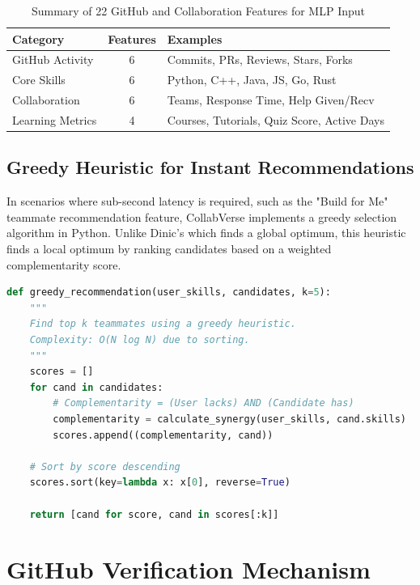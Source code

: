 \documentclass[12pt,a4paper]{article}
\begin{document}
\begin{table}[H]
\centering
\caption{Summary of 22 GitHub and Collaboration Features for MLP Input}
\label{tab:mlp_features}
\begin{tabular}{|l|c|l|}
\hline
\textbf{Category} & \textbf{Features} & \textbf{Examples} \\ \hline
GitHub Activity & 6 & Commits, PRs, Reviews, Stars, Forks \\ \hline
Core Skills & 6 & Python, C++, Java, JS, Go, Rust \\ \hline
Collaboration & 6 & Teams, Response Time, Help Given/Recv \\ \hline
Learning Metrics & 4 & Courses, Tutorials, Quiz Score, Active Days \\ \hline
\end{tabular}
\end{table}

\subsection{Greedy Heuristic for Instant Recommendations}
In scenarios where sub-second latency is required, such as the "Build for Me" teammate recommendation feature, CollabVerse implements a greedy selection algorithm in Python. Unlike Dinic's which finds a global optimum, this heuristic finds a local optimum by ranking candidates based on a weighted complementarity score.

\begin{lstlisting}[language=Python, caption=Greedy Teammate Recommendation Heuristic]
def greedy_recommendation(user_skills, candidates, k=5):
    """
    Find top k teammates using a greedy heuristic.
    Complexity: O(N log N) due to sorting.
    """
    scores = []
    for cand in candidates:
        # Complementarity = (User lacks) AND (Candidate has)
        complementarity = calculate_synergy(user_skills, cand.skills)
        scores.append((complementarity, cand))
    
    # Sort by score descending
    scores.sort(key=lambda x: x[0], reverse=True)
    
    return [cand for score, cand in scores[:k]]
\end{lstlisting}

\section{GitHub Verification Mechanism}
\end{document}
